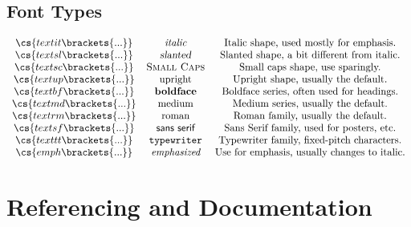 	\subsection{Font Types}
\[\begin{array}{ccc}
\cs{textit\brackets{...}} & \textit{italic} & \textup{Italic shape, used mostly for emphasis.}\\
\cs{textsl\brackets{...}} & \textsl{slanted} & \textup{Slanted shape, a bit different from italic.}\\
\cs{textsc\brackets{...}} & \textsc{Small Caps} & \textup{Small caps shape, use sparingly.}\\
\cs{textup\brackets{...}} & \textup{upright} & \textup{Upright shape, usually the default.}\\
\cs{textbf\brackets{...}} & \textbf{boldface} & \textup{Boldface series, often used for headings.}\\
\cs{textmd\brackets{...}} & \textmd{medium} & \textup{Medium series, usually the default.}\\
\cs{textrm\brackets{...}} & \textrm{roman} & \textup{Roman family, usually the default.}\\
\cs{textsf\brackets{...}} & \textsf{sans serif} & \textup{Sans Serif family, used for posters, etc.}\\
\cs{texttt\brackets{...}} & \texttt{typewriter} & \textup{Typewriter family, fixed-pitch characters.}\\
\cs{emph\brackets{...}} & \emph{emphasized} & \textup{Use for emphasis, usually changes to italic.}\\		
\end{array}\]
\newpage
{}
\section{Referencing and Documentation}
\vspace{10.5cm}
